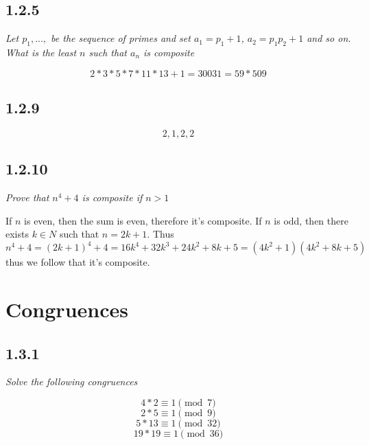 \documentclass[11pt,oneside,titlepage]{book}
\begin{document}
\subsection*{1.2.5}

\textit{Let $p_1, ..., $ be the sequence of primes and set $a_1 = p_1 + 1$,
  $a_2 = p_1 p_2 + 1$ and so on. What is the least $n$ such that $a_n$ is composite}


$$2 * 3 * 5 * 7 * 11 * 13 + 1 = 30031 = 59 * 509$$

\subsection*{1.2.9}

$$2, 1, 2, 2$$

\subsection*{1.2.10}

\textit{Prove that $n^4 + 4$ is composite if $n > 1$}

If $n$ is even, then the sum is even, therefore it's composite. If $n$ is odd, then there exists
$k \in N$ such that $n = 2k + 1$. Thus
$$n^4 + 4 = (2k + 1)^4 + 4 = 16k^4 + 32 k^3 + 24k^2 + 8k + 5 = (4k^2 + 1)(4k^2 + 8k + 5)$$
thus we follow that it's composite.

\section{Congruences}

\subsection*{1.3.1}

\textit{Solve the following congruences}

$$4 * 2  \equiv 1 \pmod 7 $$
$$2 * 5  \equiv 1 \pmod 9 $$
$$5 * 13  \equiv 1 \pmod {32} $$
$$19 * 19  \equiv 1 \pmod {36} $$
\end{document}
